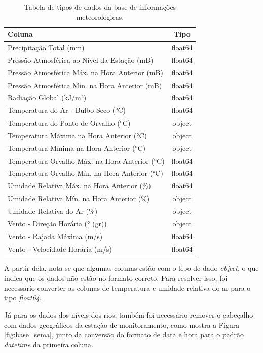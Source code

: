 \begin{table}[H]
	\centering
	\begin{tabular}{|p{10cm}|c|}
	\hline
	\textbf{Coluna} & \textbf{Tipo} \\
	\hline
	Precipitação Total (mm) & float64 \\
	Pressão Atmosférica ao Nível da Estação (mB) & float64 \\
	Pressão Atmosférica Máx. na Hora Anterior (mB) & float64 \\
	Pressão Atmosférica Mín. na Hora Anterior (mB) & float64 \\
	Radiação Global (kJ/m²) & float64 \\
	Temperatura do Ar - Bulbo Seco (°C) & float64 \\
	Temperatura do Ponto de Orvalho (°C) & object \\
	Temperatura Máxima na Hora Anterior (°C) & object \\
	Temperatura Mínima na Hora Anterior (°C) & object \\
	Temperatura Orvalho Máx. na Hora Anterior (°C) & float64 \\
	Temperatura Orvalho Mín. na Hora Anterior (°C) & float64 \\
	Umidade Relativa Máx. na Hora Anterior (\%) & float64 \\
	Umidade Relativa Mín. na Hora Anterior (\%) & object \\
	Umidade Relativa do Ar (\%) & object \\
	Vento - Direção Horária (° (gr)) & object \\
	Vento - Rajada Máxima (m/s) & float64 \\
	Vento - Velocidade Horária (m/s) & float64 \\
	\hline
	\end{tabular}
	\caption{Tabela de tipos de dados da base de informações meteorológicas.}
	\label{tab:colunas_dados_meteorologicos}
\end{table}

A partir dela, nota-se que algumas colunas estão com o tipo de dado \textit{object}, o que indica que os dados não estão no formato correto. Para resolver isso, foi necessário converter as colunas de temperatura e umidade relativa do ar para o tipo \textit{float64}.

Já para os dados dos níveis dos rios, também foi necessário remover o cabeçalho com dados geográficos da estação de monitoramento, como mostra a Figura \ref{fig:base_sema}, junto da conversão do formato de data e hora para o padrão \textit{datetime} da primeira coluna.

